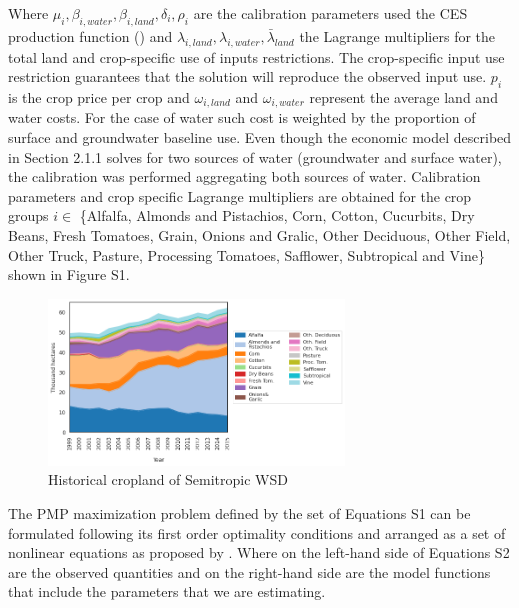 \documentclass[11pt,a4paper]{article}
\begin{document}
Where $\mu_{i},\beta_{i,water},\beta_{i,land},\delta_{i},\rho_i$ are the calibration parameters used the CES production function (\cite{merel_fully_2011}) and $\lambda_{i,land},\lambda_{i,water},\bar{\lambda}_{land}$ the Lagrange multipliers for the total land and crop-specific use of inputs restrictions. The crop-specific input use restriction guarantees that the solution will reproduce the observed input use. $p_i$ is the crop price per crop and $\omega_{i,land}$ and $\omega_{i,water}$ represent the average land and water costs.  For the case of water such cost is weighted by the proportion of surface and groundwater baseline use. Even though the economic model described in Section 2.1.1 solves for two sources of water (groundwater and surface water), the calibration was performed aggregating both sources of water. Calibration parameters and crop specific Lagrange multipliers are obtained for the crop groups $i\in$ \{Alfalfa, Almonds and Pistachios, Corn, Cotton, Cucurbits, Dry Beans, Fresh Tomatoes, Grain, Onions and Gralic, Other Deciduous, Other Field, Other Truck, Pasture, Processing Tomatoes, Safflower, Subtropical and Vine\} shown in Figure S1. 

\begin{figure}[htb!]
    \centering
    \includegraphics[width=0.7\textwidth]{./figs/land_hist_semitropic.png}
    \caption{Historical cropland of Semitropic WSD}
    \label{fig:S1}
\end{figure}

The PMP maximization problem defined by the set of Equations S1 can be formulated following its first order optimality conditions and arranged as a set of nonlinear equations as proposed by  \textcite{garnache_calibration_2017}. Where on the left-hand side of Equations S2 are the observed quantities and on the right-hand side are the model functions that include the parameters that we are estimating. 
\end{document}
